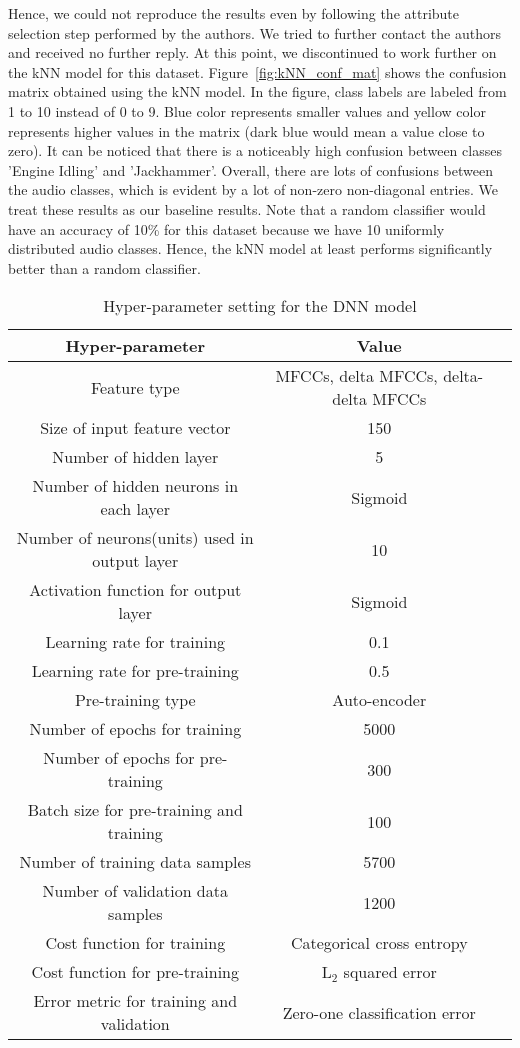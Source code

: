 Hence, we could not reproduce the results even by following the attribute selection step performed by the authors. We tried to further contact the authors and received no further reply. At this point, we discontinued to work further on the kNN model for this dataset. Figure~\ref{fig:kNN_conf_mat} shows the confusion matrix obtained using the kNN model. In the figure, class labels are labeled from 1 to 10 instead of 0 to 9. Blue color represents smaller values and yellow color represents higher values in the matrix (dark blue would mean a value close to zero). It can be noticed that there is a noticeably high confusion between classes 'Engine Idling' and 'Jackhammer'. Overall, there are lots of confusions between the audio classes, which is evident by a lot of non-zero non-diagonal entries. We treat these results as our baseline results. Note that a random classifier would have an accuracy of 10\% for this dataset because we have 10 uniformly distributed audio classes. Hence, the kNN model at least performs significantly better than a random classifier.

\begin{table}[tb]
\caption[DNN Hyperparamters DB1]{Hyper-parameter setting for the DNN model}
\label{tab:dnn_hyper_db1}
\centering
\begin{tabular}{ccc}
\toprule
Hyper-parameter & Value \\ 
\midrule
Feature type	& MFCCs, delta MFCCs, delta-delta MFCCs \\
Size of input feature vector	& 150 \\
Number of hidden layer	& 5 \\
Number of hidden neurons in each layer	& Sigmoid \\
Number of neurons(units) used in output layer	& 10 \\
Activation function for output layer	& Sigmoid \\
Learning rate for training	& 0.1 \\
Learning rate for pre-training	& 0.5 \\
Pre-training type & Auto-encoder \\
Number of epochs for training	& 5000 \\
Number of epochs for pre-training	& 300 \\
Batch size for pre-training and training	& 100 \\
Number of training data samples	& 5700 \\
Number of validation data samples	& 1200 \\
Cost function for training	& Categorical cross entropy \\
Cost function for pre-training & L$_{\text{2}}$ squared error\\
Error metric for training and validation	& Zero-one classification error\\
\bottomrule 
\end{tabular}
\end{table}

